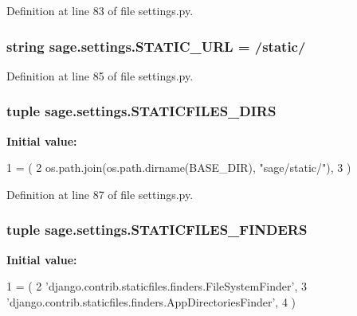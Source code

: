 Definition at line 83 of file settings.\+py.

\hypertarget{namespacesage_1_1settings_a0b4647cdde23eaed09c255182a9f576c}{}
\subsubsection[{S\+T\+A\+T\+I\+C\+\_\+\+U\+R\+L}]{\setlength{\rightskip}{0pt plus 5cm}string sage.\+settings.\+S\+T\+A\+T\+I\+C\+\_\+\+U\+R\+L = \textquotesingle{}/static/\textquotesingle{}}\label{namespacesage_1_1settings_a0b4647cdde23eaed09c255182a9f576c}


Definition at line 85 of file settings.\+py.

\hypertarget{namespacesage_1_1settings_ac4ae870dea0d58410747ddcbdff2b3d7}{}
\subsubsection[{S\+T\+A\+T\+I\+C\+F\+I\+L\+E\+S\+\_\+\+D\+I\+R\+S}]{\setlength{\rightskip}{0pt plus 5cm}tuple sage.\+settings.\+S\+T\+A\+T\+I\+C\+F\+I\+L\+E\+S\+\_\+\+D\+I\+R\+S}\label{namespacesage_1_1settings_ac4ae870dea0d58410747ddcbdff2b3d7}
{\bfseries Initial value\+:}
\begin{DoxyCode}
1 = (
2         os.path.join(os.path.dirname(BASE\_DIR), \textcolor{stringliteral}{"sage/static/"}),
3 )
\end{DoxyCode}


Definition at line 87 of file settings.\+py.

\hypertarget{namespacesage_1_1settings_af629022b1da961fa9828f450bc80bd22}{}
\subsubsection[{S\+T\+A\+T\+I\+C\+F\+I\+L\+E\+S\+\_\+\+F\+I\+N\+D\+E\+R\+S}]{\setlength{\rightskip}{0pt plus 5cm}tuple sage.\+settings.\+S\+T\+A\+T\+I\+C\+F\+I\+L\+E\+S\+\_\+\+F\+I\+N\+D\+E\+R\+S}\label{namespacesage_1_1settings_af629022b1da961fa9828f450bc80bd22}
{\bfseries Initial value\+:}
\begin{DoxyCode}
1 = (
2     \textcolor{stringliteral}{'django.contrib.staticfiles.finders.FileSystemFinder'},
3     \textcolor{stringliteral}{'django.contrib.staticfiles.finders.AppDirectoriesFinder'},
4 )
\end{DoxyCode}


